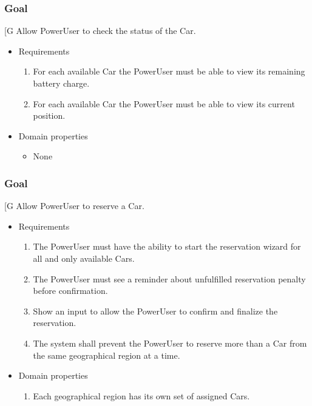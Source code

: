     \subsubsection{Goal }
    {[}G\arabic{goalctr}{]}
    Allow PowerUser to check the status of the Car.
    \begin{itemize}
        \item Requirements
        \begin{enumerate}[REQ]
    		    \item For each available Car the PowerUser must be able to view its remaining battery charge.
			    \item For each available Car the PowerUser must be able to view its current position.
        \end{enumerate}
        \item Domain properties
        \begin{itemize}
    			\item None
        \end{itemize}
    \end{itemize}

    \subsubsection{Goal }
    {[}G\arabic{goalctr}{]}
    Allow PowerUser to reserve a Car.
    \begin{itemize}
        \item Requirements
        \begin{enumerate}[REQ]
    		    \item The PowerUser must have the ability to start the reservation wizard for all and only available Cars.
			    \item The PowerUser must see a reminder about unfulfilled reservation penalty before confirmation.
			    \item Show an input to allow the PowerUser to confirm and finalize the reservation.
			    \item The system shall prevent the PowerUser to reserve more than a Car from the same geographical region at a time.
        \end{enumerate}
        \item Domain properties
        \begin{enumerate}[PRO]
    			\item Each geographical region has its own set of assigned Cars.
        \end{enumerate}
    \end{itemize}
    
